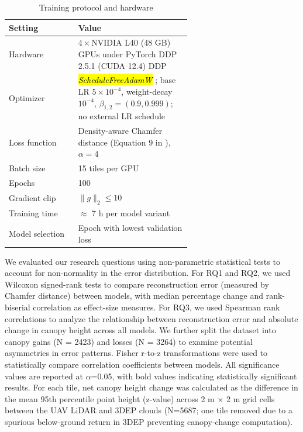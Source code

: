 \documentclass[remotesensing,article,accept,pdftex,moreauthors]{Definitions/mdpi}
\begin{document}
\begin{table}[htbp]
  \centering
  \caption{Training protocol and hardware}
  \label{tab:training_protocol}
  \begin{tabular}{lp{0.62\linewidth}}
    \toprule
    \textbf{Setting} & \textbf{Value} \\
    \midrule
    Hardware      & 4\,×\,NVIDIA L40 (48 GB) GPUs under PyTorch DDP 2.5.1 (CUDA 12.4) %
 DDP \\
    Optimizer     & \textit{\hl{ScheduleFreeAdamW}} \cite{defazio_road_2024}; base LR $5\times10^{-4}$, weight-decay $10^{-4}$, $\beta_{1,2}=(0.9,0.999)$; no external LR schedule \\
    Loss function & Density-aware Chamfer distance (Equation 9 in \cite{wu_density-aware_2021}), $\alpha=4$ \\
    Batch size    & 15 tiles per GPU \\
    Epochs        & 100 \\
    Gradient clip & $\lVert g\rVert_2 \le 10$ \\
    Training time & $\approx$ 7 h per model variant \\
    Model selection & Epoch with lowest validation loss \\
    \bottomrule
  \end{tabular}
\end{table}

\vspace{-3pt}

We evaluated our research questions using non-parametric statistical tests to account for non-normality in the error distribution. For RQ1 and RQ2, we used Wilcoxon signed-rank tests to compare reconstruction error (measured by Chamfer distance) between models, with median percentage change and rank-biserial correlation as effect-size measures. For RQ3, we used Spearman rank correlations to analyze the relationship between reconstruction error and absolute change in canopy height across all models. We further split the dataset into canopy gains (N = 2423) and losses (N = 3264) to examine potential asymmetries in error patterns. Fisher r-to-z transformations were used to statistically compare correlation coefficients between models. All significance values are reported at $\alpha$=0.05, with bold values indicating statistically significant results.
For each tile, net canopy height change was calculated as the difference in the mean 95th percentile point height (z-value) across 2 m × 2 m grid cells between the UAV LiDAR and 3DEP clouds (N=5687; one tile removed due to a spurious below-ground return in 3DEP preventing canopy-change computation).
\end{document}

